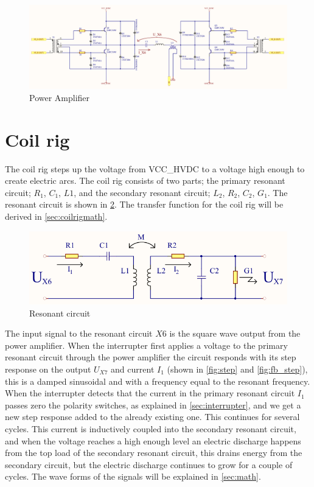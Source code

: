\begin{figure}[H]
    \centering
    \includegraphics[width=0.9\textheight,angle=-90]{Skjema/TK531_Utgangstrinn_r.pdf}
    \caption{Power Amplifier}
    \label{fig:tk531}
\end{figure}

\newpage
\section{Coil rig}
\label{sec:resonant}

The coil rig steps up the voltage from VCC\_HVDC to a voltage high enough to create electric arcs. The coil rig consists of two parts; the primary resonant circuit; $R_1$, $C_1$, $L1$, and the secondary resonant circuit; $L_2$, $R_2$, $C_2$, $G_1$. The resonant circuit is shown in \cref{fig:spolerigg1}. The transfer function for the coil rig will be derived in \cref{sec:coilrigmath}.

\begin{figure}[H]
    \centering
    \includegraphics[width=\textwidth]{Skjema/Spolerigg1_r.pdf}
    \caption{Resonant circuit}
    \label{fig:spolerigg1}
\end{figure}

The input signal to the resonant circuit $X6$ is the square wave output from the power amplifier. When the interrupter first applies a voltage to the primary resonant circuit through the power amplifier the circuit responds with its step response on the output $U_{X7}$ and current $I_1$ (shown in \cref{fig:step} and \cref{fig:fb_step}), this is a damped sinusoidal and with a frequency equal to the resonant frequency. When the interrupter detects that the current in the primary resonant circuit $I_1$ passes zero the polarity switches, as explained in \cref{sec:interrupter}, and we get a new step response added to the already existing one. This continues for several cycles. This current is inductively coupled into the secondary resonant circuit, and when the voltage reaches a high enough level an electric discharge happens from the top load of the secondary resonant circuit, this drains energy from the secondary circuit, but the electric discharge continues to grow for a couple of cycles. The wave forms of the signals will be explained in \cref{sec:math}.

